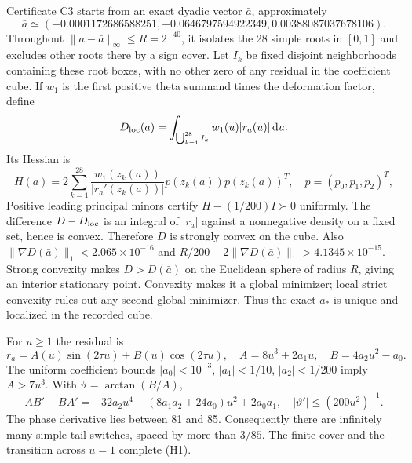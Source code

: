 \documentclass[11pt,a4paper]{article}
\numberwithin{equation}{section}
\theoremstyle{remark}\newtheorem{remark}[theorem]{Remark}
\newcommand{\dd}{\,\mathrm du}
\newcommand{\norm}[1]{\lVert#1\rVert}
\begin{document}
Certificate C3 starts from an exact dyadic vector $\bar a$, approximately
\begin{equation}
 \bar a\simeq(-0.0001172686588251,
           -0.0646797594922349,
            0.00388087037678106).
\end{equation}
Throughout $\norm{a-\bar a}_\infty\le R=2^{-40}$, it isolates the 28 simple
roots in $[0,1]$ and excludes other roots there by a sign cover.
Let $I_k$ be fixed disjoint neighborhoods containing these root boxes,
with no other zero of any residual in the coefficient cube. If $w_1$ is
the first positive theta summand times the deformation factor, define
\begin{equation}
 D_{\rm loc}(a)=\int_{\bigcup_{k=1}^{28}I_k}w_1(u)|r_a(u)|\dd.
 \label{eq:localD}
\end{equation}
Its Hessian is
\begin{equation}
 H(a)=2\sum_{k=1}^{28}
 \frac{w_1(z_k(a))}{|r_a'(z_k(a))|}
 p(z_k(a))p(z_k(a))^T,\quad p=(p_0,p_1,p_2)^T,
\end{equation}
Positive leading principal minors certify $H-(1/200)I\succ0$
uniformly. The difference $D-D_{\rm loc}$ is an integral of $|r_a|$
against a nonnegative density on a fixed set, hence is convex. Therefore
$D$ is strongly convex on the cube. Also
$\norm{\nabla D(\bar a)}_1<2.065\times10^{-16}$ and
$R/200-2\norm{\nabla D(\bar a)}_1>4.1345\times10^{-15}$.
Strong convexity makes $D>D(\bar a)$ on the Euclidean sphere of radius $R$,
giving an interior stationary point. Convexity makes it a global
minimizer; local strict convexity rules out any second global minimizer.
Thus the exact $a_*$ is unique and localized in the recorded cube.

For $u\ge1$ the residual is
\begin{equation}
 r_a=A(u)\sin(2\tau u)+B(u)\cos(2\tau u),\quad
 A=8u^3+2a_1u,\quad B=4a_2u^2-a_0.\label{eq:phase}
\end{equation}
The uniform coefficient bounds
$|a_0|<10^{-3}$, $|a_1|<1/10$, $|a_2|<1/200$ imply $A>7u^3$.
With $\vartheta=\arctan(B/A)$,
\begin{equation}
 AB'-BA'=-32a_2u^4+(8a_1a_2+24a_0)u^2+2a_0a_1,
 \quad |\vartheta'|\le(200u^2)^{-1}.
\end{equation}
The phase derivative lies between 81 and 85. Consequently there are
infinitely many simple tail switches, spaced by more than $3/85$.
The finite cover and the transition across $u=1$ complete (H1).
\end{document}
